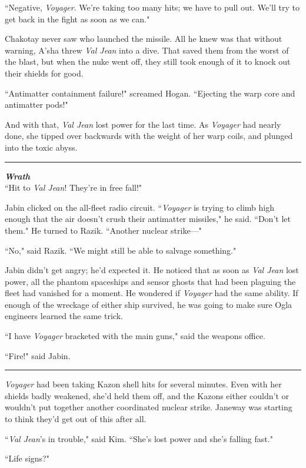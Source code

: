 \documentclass[twoside,letterpaper,12pt]{memoir}
\begin{document}
``Negative, \textit{Voyager}. We're taking too many hits; we have to pull out. We'll try to get back in the fight as soon as we can."

Chakotay never saw who launched the missile. All he knew was that without warning, A'sha threw \textit{Val Jean} into a dive. That saved them from the worst of the blast, but when the nuke went off, they still took enough of it to knock out their shields for good.

``Antimatter containment failure!" screamed Hogan. ``Ejecting the warp core and antimatter pods!"

And with that, \textit{Val Jean} lost power for the last time. As \textit{Voyager} had nearly done, she tipped over backwards with the weight of her warp coils, and plunged into the toxic abyss.

\fancybreak{\rule{3cm}{0.4 pt}}
\noindent\textit{\textbf{Wrath}}\\

``Hit to \textit{Val Jean}! They're in free fall!"

Jabin clicked on the all-fleet radio circuit. ``\textit{Voyager} is trying to climb high enough that the air doesn't crush their antimatter missiles," he said. ``Don't let them." He turned to Razik. ``Another nuclear strike---"

``No," said Razik. ``We might still be able to salvage something."

Jabin didn't get angry; he'd expected it. He noticed that as soon as \textit{Val Jean} lost power, all the phantom spaceships and sensor ghosts that had been plaguing the fleet had vanished for a moment. He wondered if \textit{Voyager} had the same ability. If enough of the wreckage of either ship survived, he was going to make sure Ogla engineers learned the same trick.

``I have \textit{Voyager} bracketed with the main guns," said the weapons office.

``Fire!" said Jabin.

\fancybreak{\rule{3cm}{0.4 pt}}
\textit{Voyager} had been taking Kazon shell hits for several minutes. Even with her shields badly weakened, she'd held them off, and the Kazons either couldn't or wouldn't put together another coordinated nuclear strike. Janeway was starting to think they'd get out of this after all.

``\textit{Val Jean}'s in trouble," said Kim. ``She's lost power and she's falling fast."

``Life signs?"
\end{document}
